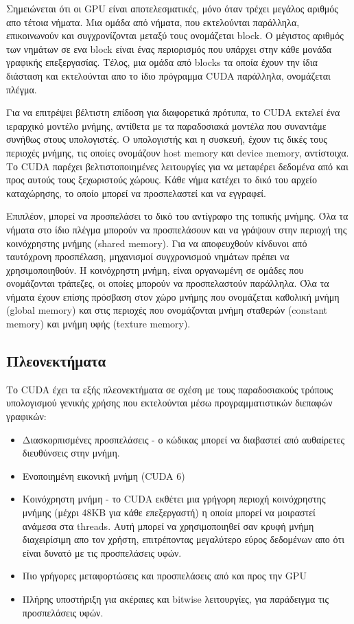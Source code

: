 Σημειώνεται ότι οι GPU είναι αποτελεσματικές, μόνο όταν τρέχει μεγάλος αριθμός απο τέτοια νήματα. Μια ομάδα από νήματα, που εκτελούνται παράλληλα, επικοινωνούν και συγχρονίζονται μεταξύ τους ονομάζεται block. Ο μέγιστος αριθμός των νημάτων σε ενα block είναι ένας περιορισμός που υπάρχει στην κάθε μονάδα γραφικής επεξεργασίας. Τέλος, μια ομάδα από blocks τα οποία έχουν την ίδια διάσταση και εκτελούνται απο το ίδιο πρόγραμμα CUDA παράλληλα, ονομάζεται πλέγμα.

Για να επιτρέψει βέλτιστη επίδοση για διαφορετικά πρότυπα, το CUDA εκτελεί ένα ιεραρχικό μοντέλο μνήμης, αντίθετα με τα παραδοσιακά μοντέλα που συναντάμε συνήθως στους υπολογιστές. Ο υπολογιστής και η συσκευή, έχουν τις δικές τους περιοχές μνήμης, τις οποίες ονομάζουν host memory και device memory, αντίστοιχα. Το CUDA παρέχει βελτιστοποιημένες λειτουργίες για να μεταφέρει δεδομένα από και προς αυτούς τους ξεχωριστούς χώρους.
Κάθε νήμα κατέχει το δικό του αρχείο καταχώρησης, το οποίο μπορεί να προσπελαστεί και να εγγραφεί.

Επιπλέον, μπορεί να προσπελάσει το δικό του αντίγραφο της τοπικής μνήμης. Όλα τα νήματα στο ίδιο πλέγμα μπορούν να προσπελάσουν και να γράψουν στην περιοχή της κοινόχρηστης μνήμης (shared memory). Για να αποφευχθούν κίνδυνοι από ταυτόχρονη προσπέλαση, μηχανισμοί συγχρονισμού νημάτων πρέπει να χρησιμοποιηθούν. Η κοινόχρηστη μνήμη, είναι οργανωμένη σε ομάδες που ονομάζονται τράπεζες, οι οποίες μπορούν να προσπελαστούν παράλληλα. Όλα τα νήματα έχουν επίσης πρόσβαση στον χώρο μνήμης που ονομάζεται καθολική μνήμη (global memory) και στις περιοχές που ονομάζονται μνήμη σταθερών (constant memory) και μνήμη υφής (texture memory).\cite{cuda-2}

\subsection{Πλεονεκτήματα}
Το CUDA έχει τα εξής πλεονεκτήματα σε σχέση με τους παραδοσιακούς τρόπους υπολογισμού γενικής χρήσης που εκτελούνται μέσω προγραμματιστικών διεπαφών γραφικών:
\begin{itemize}
\item Διασκορπισμένες προσπελάσεις - ο κώδικας μπορεί να διαβαστεί από αυθαίρετες διευθύνσεις στην μνήμη.
\item Ενοποιημένη εικονική μνήμη (CUDA 6)
\item Κοινόχρηστη μνήμη - το CUDA εκθέτει μια γρήγορη περιοχή κοινόχρηστης μνήμης (μέχρι 48KB για κάθε επεξεργαστή) η οποία μπορεί να μοιραστεί ανάμεσα στα threads. Αυτή μπορεί να χρησιμοποιηθεί σαν κρυφή μνήμη διαχειρίσιμη απο τον χρήστη, επιτρέποντας μεγαλύτερο εύρος δεδομένων απο ότι είναι δυνατό με τις προσπελάσεις υφών.
\item Πιο γρήγορες μεταφορτώσεις και προσπελάσεις από και προς την GPU
\item Πλήρης υποστήριξη για ακέραιες και bitwise λειτουργίες, για παράδειγμα τις προσπελάσεις υφών.
\end{itemize}
